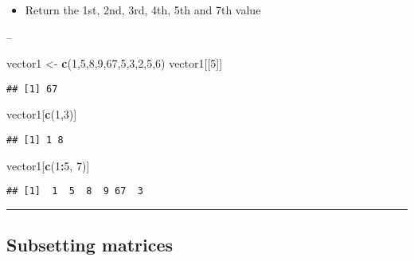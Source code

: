 \documentclass[]{article}
\newenvironment{Shaded}{\begin{snugshade}}{\end{snugshade}}
\newcommand{\DecValTok}[1]{\textcolor[rgb]{0.00,0.00,0.81}{#1}}
\newcommand{\KeywordTok}[1]{\textcolor[rgb]{0.13,0.29,0.53}{\textbf{#1}}}
\newcommand{\NormalTok}[1]{#1}
\newcommand{\OperatorTok}[1]{\textcolor[rgb]{0.81,0.36,0.00}{\textbf{#1}}}
\newcommand{\StringTok}[1]{\textcolor[rgb]{0.31,0.60,0.02}{#1}}
\providecommand{\tightlist}{%
  \setlength{\itemsep}{0pt}\setlength{\parskip}{0pt}}
\begin{document}
\begin{itemize}
\tightlist
\item
  Return the 1st, 2nd, 3rd, 4th, 5th and 7th value
\end{itemize}

--

\begin{Shaded}
\begin{Highlighting}[]
\NormalTok{vector1 <-}\StringTok{ }\KeywordTok{c}\NormalTok{(}\DecValTok{1}\NormalTok{,}\DecValTok{5}\NormalTok{,}\DecValTok{8}\NormalTok{,}\DecValTok{9}\NormalTok{,}\DecValTok{67}\NormalTok{,}\DecValTok{5}\NormalTok{,}\DecValTok{3}\NormalTok{,}\DecValTok{2}\NormalTok{,}\DecValTok{5}\NormalTok{,}\DecValTok{6}\NormalTok{)}
\NormalTok{vector1[[}\DecValTok{5}\NormalTok{]]}
\end{Highlighting}
\end{Shaded}

\begin{verbatim}
## [1] 67
\end{verbatim}

\begin{Shaded}
\begin{Highlighting}[]
\NormalTok{vector1[}\KeywordTok{c}\NormalTok{(}\DecValTok{1}\NormalTok{,}\DecValTok{3}\NormalTok{)]}
\end{Highlighting}
\end{Shaded}

\begin{verbatim}
## [1] 1 8
\end{verbatim}

\begin{Shaded}
\begin{Highlighting}[]
\NormalTok{vector1[}\KeywordTok{c}\NormalTok{(}\DecValTok{1}\OperatorTok{:}\DecValTok{5}\NormalTok{, }\DecValTok{7}\NormalTok{)]}
\end{Highlighting}
\end{Shaded}

\begin{verbatim}
## [1]  1  5  8  9 67  3
\end{verbatim}

\begin{center}\rule{0.5\linewidth}{\linethickness}\end{center}

\hypertarget{subsetting-matrices}{%
\subsection{Subsetting matrices}\label{subsetting-matrices}}
\end{document}
